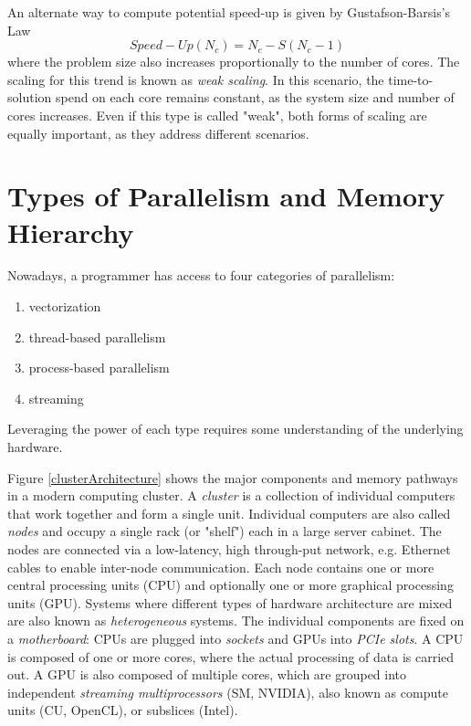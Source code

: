 An alternate way to compute potential speed-up is given by Gustafson-Barsis's Law
\begin{equation}
Speed-Up(N_c) = N_c - S(N_c-1)
\end{equation}
\noindent where the problem size also increases proportionally to the number of cores. The scaling for this trend is known as \emph{weak scaling}. In this scenario, the time-to-solution spend on each core remains constant, as the system size and number of cores increases. Even if this type is called "weak", both forms of scaling are equally important, as they address different scenarios. 

\section{Types of Parallelism and Memory Hierarchy}

Nowadays, a programmer has access to four categories of parallelism:
\begin{enumerate}
\item vectorization
\item thread-based parallelism
\item process-based parallelism
\item streaming
\end{enumerate} 
\noindent Leveraging the power of each type requires some understanding of the underlying hardware. 

Figure \ref{clusterArchitecture} shows the major components and memory pathways in a modern computing cluster. A \emph{cluster} is a collection of individual computers that work together and form a single unit. Individual computers are also called \emph{nodes} and occupy a single rack (or "shelf") each in a large server cabinet. The nodes are connected via a low-latency, high through-put network, e.g. Ethernet cables to enable inter-node communication. Each node contains one or more central processing units (CPU) and optionally one or more graphical processing units (GPU). Systems where different types of hardware architecture are mixed are also known as \emph{heterogeneous} systems. The individual components are fixed on a \emph{motherboard}: CPUs are plugged into \emph{sockets} and GPUs into \emph{PCIe slots}. A CPU is composed of one or more cores, where the actual processing of data is carried out. A GPU is also composed of multiple cores, which are grouped into independent \emph{streaming multiprocessors} (SM, NVIDIA), also known as compute units (CU, OpenCL), or subslices (Intel). 


